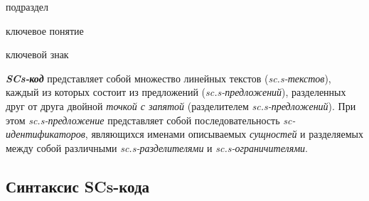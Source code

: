 \begin{SCn}
\begin{scnrelfromlist}{подраздел}
\end{scnrelfromlist}

\begin{scnrelfromlist}{ключевое понятие}
\end{scnrelfromlist}

\begin{scnrelfromlist}{ключевой знак}
\end{scnrelfromlist}
\end{SCn}

\begin{SCn}
\end{SCn}

\textbf{\textit{SCs-код}} представляет собой множество линейных текстов (\textit{sc.s-текстов}), каждый из которых состоит из предложений (\textit{sc.s-предложений}), разделенных друг от друга двойной \textit{точкой с запятой} (разделителем \textit{sc.s-предложений}). При этом \mbox{\textit{sc.s-предложение}} представляет собой последовательность \textit{sc-идентификаторов}, являющихся именами описываемых \textit{сущностей} и разделяемых между собой различными \textit{sc.s-разделителями} и \textit{sc.s-ограничителями}.

\subsection{Синтаксис SCs-кода}
\label{sec_scs_syntax}

